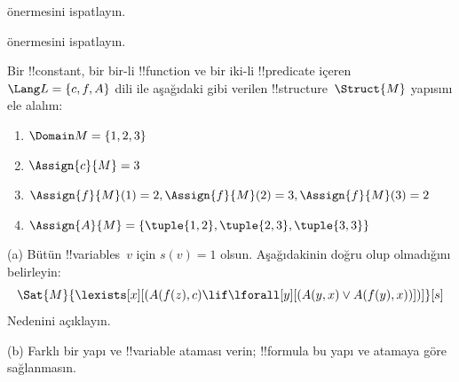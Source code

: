 \documentclass[../../../include/open-logic-section]{subfiles}
\begin{document}

\begin{prob}
   önermesini ispatlayın.
\end{prob}
\tagendprob


\begin{prob}
   önermesini ispatlayın.
\end{prob}
\tagendprob

\begin{prob}
Bir !!{constant}, bir bir-li !!{function} ve bir iki-li !!{predicate}
içeren $\Lang L = \{c, f, A\}$ dili ile aşağıdaki gibi verilen
!!{structure}~$\Struct{M}$ yapısını ele alalım:
\begin{enumerate}
\item $\Domain M = \{1, 2, 3\}$
\item $\Assign{c}{M} = 3$
\item $\Assign{f}{M}(1) = 2, \Assign{f}{M}(2) = 3, \Assign{f}{M}(3) = 2$
\item $\Assign{A}{M} = \{\tuple{1, 2}, \tuple{2, 3}, \tuple{3, 3}\}$
\end{enumerate}
(a) Bütün !!{variable}s~$v$ için $s(v) = 1$ olsun. Aşağıdakinin doğru
olup olmadığını belirleyin:
\[
\Sat{M}{\lexists[x][(A(f(z), c) \lif \lforall[y][(A(y, x) \lor A(f(y),
      x))])]}[s]
\]
Nedenini açıklayın.

(b) Farklı bir yapı ve !!{variable} ataması verin; !!{formula} bu yapı
ve atamaya göre sağlanmasın.
\end{prob}
\end{document}
